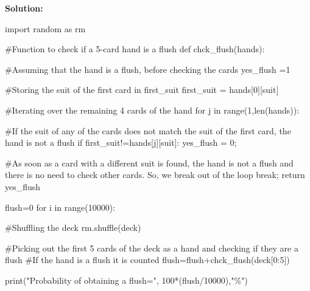 \documentclass[
  letterpaper,
  DIV=11,
  numbers=noendperiod]{scrreprt}
\newenvironment{Shaded}{\begin{snugshade}}{\end{snugshade}}
\newcommand{\BuiltInTok}[1]{\textcolor[rgb]{0.00,0.23,0.31}{#1}}
\newcommand{\CommentTok}[1]{\textcolor[rgb]{0.37,0.37,0.37}{#1}}
\newcommand{\ControlFlowTok}[1]{\textcolor[rgb]{0.00,0.23,0.31}{#1}}
\newcommand{\DecValTok}[1]{\textcolor[rgb]{0.68,0.00,0.00}{#1}}
\newcommand{\ImportTok}[1]{\textcolor[rgb]{0.00,0.46,0.62}{#1}}
\newcommand{\KeywordTok}[1]{\textcolor[rgb]{0.00,0.23,0.31}{#1}}
\newcommand{\NormalTok}[1]{\textcolor[rgb]{0.00,0.23,0.31}{#1}}
\newcommand{\OperatorTok}[1]{\textcolor[rgb]{0.37,0.37,0.37}{#1}}
\newcommand{\StringTok}[1]{\textcolor[rgb]{0.13,0.47,0.30}{#1}}
\begin{document}
\textbf{Solution:}

\begin{Shaded}
\begin{Highlighting}[]
\ImportTok{import}\NormalTok{ random }\ImportTok{as}\NormalTok{ rm}

\CommentTok{\#Function to check if a 5{-}card hand is a flush}
\KeywordTok{def}\NormalTok{ chck\_flush(hands):  }
    
    \CommentTok{\#Assuming that the hand is a flush, before checking the cards}
\NormalTok{    yes\_flush }\OperatorTok{=}\DecValTok{1}
    
    \CommentTok{\#Storing the suit of the first card in \textquotesingle{}first\_suit\textquotesingle{}}
\NormalTok{    first\_suit }\OperatorTok{=}\NormalTok{ hands[}\DecValTok{0}\NormalTok{][}\StringTok{\textquotesingle{}suit\textquotesingle{}}\NormalTok{]}
    
    \CommentTok{\#Iterating over the remaining 4 cards of the hand}
    \ControlFlowTok{for}\NormalTok{ j }\KeywordTok{in} \BuiltInTok{range}\NormalTok{(}\DecValTok{1}\NormalTok{,}\BuiltInTok{len}\NormalTok{(hands)):}
        
        \CommentTok{\#If the suit of any of the cards does not match the suit of the first card, the hand is not a flush}
        \ControlFlowTok{if}\NormalTok{ first\_suit}\OperatorTok{!=}\NormalTok{hands[j][}\StringTok{\textquotesingle{}suit\textquotesingle{}}\NormalTok{]:}
\NormalTok{            yes\_flush }\OperatorTok{=} \DecValTok{0}\OperatorTok{;} 
            
            \CommentTok{\#As soon as a card with a different suit is found, the hand is not a flush and there is no need to check other cards. So, we \textquotesingle{}break\textquotesingle{} out of the loop}
            \ControlFlowTok{break}\OperatorTok{;}
    \ControlFlowTok{return}\NormalTok{ yes\_flush}

\NormalTok{flush}\OperatorTok{=}\DecValTok{0}
\ControlFlowTok{for}\NormalTok{ i }\KeywordTok{in} \BuiltInTok{range}\NormalTok{(}\DecValTok{10000}\NormalTok{):}
    
    \CommentTok{\#Shuffling the deck}
\NormalTok{    rm.shuffle(deck)}
    
    \CommentTok{\#Picking out the first 5 cards of the deck as a hand and checking if they are a flush}
    \CommentTok{\#If the hand is a flush it is counted}
\NormalTok{    flush}\OperatorTok{=}\NormalTok{flush}\OperatorTok{+}\NormalTok{chck\_flush(deck[}\DecValTok{0}\NormalTok{:}\DecValTok{5}\NormalTok{])}
    
\BuiltInTok{print}\NormalTok{(}\StringTok{"Probability of obtaining a flush="}\NormalTok{, }\DecValTok{100}\OperatorTok{*}\NormalTok{(flush}\OperatorTok{/}\DecValTok{10000}\NormalTok{),}\StringTok{"\%"}\NormalTok{)}
\end{Highlighting}
\end{Shaded}
\end{document}
